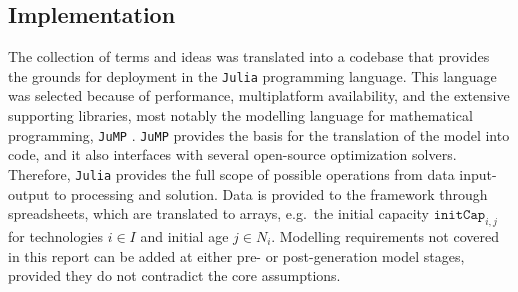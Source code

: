 \documentclass{amsart}
\begin{document}
\subsection{Implementation}
The collection of terms and ideas was translated into a codebase that provides
the grounds for deployment in the \texttt{Julia} 
\cite{bezanson2012julia} programming
language. This language was selected because of performance, multiplatform
availability, and the extensive supporting libraries, most notably the modelling
language for mathematical programming, \texttt{JuMP} \cite{dunning2017jump}.
\texttt{JuMP} provides the basis for the translation of the model into code, and
it also interfaces with several open-source optimization solvers. Therefore,
\texttt{Julia} provides the full scope of possible operations from data
input-output to processing and solution. 
%
Data is provided to the framework through spreadsheets, which are translated to
arrays, e.g.\ the initial capacity $\mathtt{initCap}_{i,j}$ for technologies
$i\in I$ and initial age $j\in N_i$. Modelling requirements not covered in this
report can be added at either pre- or post-generation model stages, provided
they do not contradict the core assumptions.
%
%
%
\end{document}

